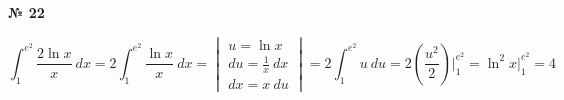 \documentclass{article}
\begin{document}
\textbf{№ 22} 
\large

$$ \int_{1}^{e^2} \frac{2\ln{x}}{x} \ dx 
= 2 \int_{1}^{e^2} \frac{\ln{x}}{x} \ dx 
= \begin{vmatrix} u = \ln{x}\\
                 du = \frac{1}{x} \ dx \\
                 dx = x \ du \end{vmatrix}
= 2 \int_{1}^{e^2} u \ du 
= 2 \left( \frac{u^2}{2} \right) \bigg\vert_{1}^{e^2}
= \ln^2{x} \bigg\vert_{1}^{e^2}
= 4 $$
\end{document}

